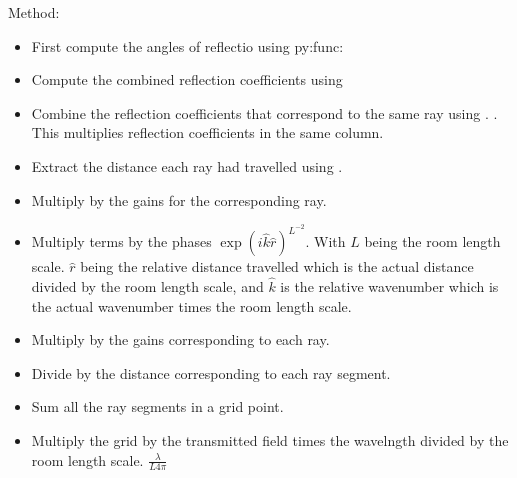 \documentclass[letterpaper,10pt,english]{sphinxmanual}
\begin{document}
\begin{fulllineitems}
\begin{quote}
\begin{description}
\begin{itemize}
\end{itemize}

\end{description}\end{quote}

Method:
\begin{itemize}
\item {} 
First compute the angles of reflectio using py:func:

\item {} 
Compute the combined reflection coefficients using     

\item {} 
Combine the reflection coefficients that correspond to the same     ray using {\hyperref[\detokenize{index:DictionarySparseMatrix.DS}]{}}. . This     multiplies reflection coefficients in the same column.

\item {} 
Extract the distance each ray had travelled using     {\hyperref[\detokenize{index:DictionarySparseMatrix.DS}]{}}. 

\item {} 
Multiply by the gains for the corresponding ray.

\item {} 
Multiply terms by the phases     \(\exp(i\hat{k} \hat{r})^{L^{-2}}\). With \(L\) being     the room length scale. \(\hat{r}\) being the relative distance     travelled which is the actual distance divided by the room length     scale, and \(\hat{k}\) is the relative wavenumber which is the     actual wavenumber times the room length scale.

\item {} 
Multiply by the gains corresponding to each ray.

\item {} 
Divide by the distance corresponding to each ray segment.

\item {} 
Sum all the ray segments in a grid point.

\item {} 
Multiply the grid by the transmitted field times the wavelngth     divided by the room length scale. \(\frac{\lambda}{L 4 \pi}\)


\end{itemize}
\end{fulllineitems}
\end{document}
